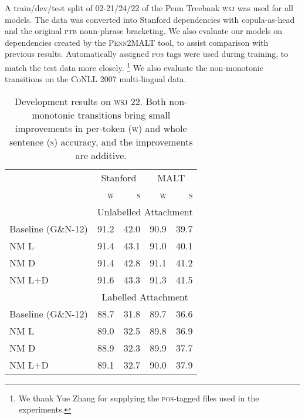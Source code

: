 \documentclass[11pt,letterpaper]{article}
\newcommand{\pos}{\textsc{pos}\xspace}
\newcommand{\wsj}{\textsc{wsj}\xspace}
\begin{document}
A train/dev/test split of 02-21/24/22 of the Penn Treebank \textsc{wsj} \citep{marcus:94}
was used for all models. The data was converted into
Stanford dependencies \citep{stanford_deps} with copula-as-head and
the original \textsc{ptb} noun-phrase bracketing. We also evaluate our models on
dependencies created by the \textsc{Penn2MALT} tool, to assist comparison 
with previous results. Automatically assigned \pos tags were used during training,
to match the test data more closely.
\footnote{We thank Yue Zhang for supplying the \textsc{pos}-tagged files used
in the \citet{zhang:11} experiments.} We also evaluate the non-monotonic transitions
on the CoNLL 2007 multi-lingual data.
\begin{table}[t]
    \small
    \centering
    \begin{tabular}{l|rrrr}
        \hline
        & \multicolumn{2}{c}{Stanford} & \multicolumn{2}{c}{MALT}  \\
        & \textsc{w}  & \textsc{s} & \textsc{w} & \textsc{s} \\
        \hline \hline
        & \multicolumn{4}{c}{Unlabelled Attachment} \\
        \hline
        Baseline (G\&N-12) & 91.2 & 42.0 & 90.9 & 39.7 \\
        NM L & 91.4 & 43.1 & 91.0 & 40.1 \\
        NM D & 91.4 & 42.8 & 91.1 & 41.2 \\
        NM L+D & 91.6 & 43.3 & 91.3 & 41.5 \\
        \hline
        & \multicolumn{4}{c}{Labelled Attachment} \\
        \hline
        Baseline (G\&N-12)& 88.7 & 31.8 & 89.7 & 36.6 \\
        NM L & 89.0 & 32.5 & 89.8 & 36.9 \\
        NM D & 88.9 & 32.3 & 89.9 & 37.7 \\
        NM L+D & 89.1 & 32.7 & 90.0 & 37.9 \\
        \hline
    \end{tabular}
    \caption{\small
        Development results on \wsj 22. Both non-monotonic transitions
        bring small improvements in per-token (\textsc{w}) and whole sentence (\textsc{s})
        accuracy, and the improvements are additive.
        \label{tab:goldberg}}
\vspace{-0.5\baselineskip}
\end{table}
\end{document}
